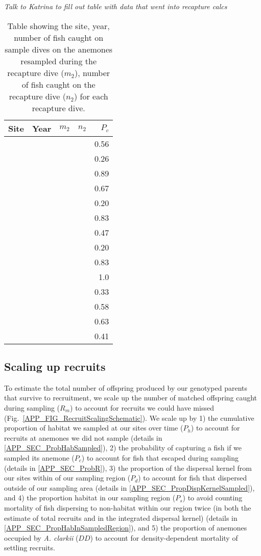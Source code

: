 \documentclass[12pt, oneside]{article}   	%
\begin{document}
\textit{Talk to Katrina to fill out table with data that went into recapture calcs}

\begin{table}[!htbp]
\caption{Table showing the site, year, number of fish caught on sample dives on the anemones resampled during the recapture dive ($m_2$), number of fish caught on the recapture dive ($n_2$) for each recapture dive.} \label{APP_TAB_RecapDives}
\begin{centering}
\begin{tabular}{|l|r|r|r|r|}
\hline
Site & Year & $m_2$ & $n_2$ & $P_c$ \\ \hline
& & & & 0.56 \\ \hline
& & & & 0.26 \\ \hline
& & & & 0.89 \\ \hline
& & & & 0.67 \\ \hline
& & & & 0.20 \\ \hline
& & & & 0.83 \\ \hline
& & & & 0.47 \\ \hline
& & & & 0.20 \\ \hline
& & & & 0.83 \\ \hline
& & & & 1.0 \\ \hline
& & & & 0.33 \\ \hline
& & & & 0.58 \\ \hline
& & & & 0.63 \\ \hline
& & & & 0.41 \\ \hline
\end{tabular}
\end{centering}
\end{table}

\newpage{}

\subsection{Scaling up recruits}

To estimate the total number of offspring produced by our genotyped parents that survive to recruitment, we scale up the number of matched offspring caught during sampling ($R_m$) to account for recruits we could have missed (Fig.\ \ref{APP_FIG_RecruitScalingSchematic}). We scale up by 1) the cumulative proportion of habitat we sampled at our sites over time ($P_h$) to account for recruits at anemones we did not sample (details in \ref{APP_SEC_ProbHabSampled}), 2) the probability of capturing a fish if we sampled its anemone ($P_c$) to account for fish that escaped during sampling (details in \ref{APP_SEC_ProbR}), 3) the proportion of the dispersal kernel from our sites within of our sampling region ($P_d$) to account for fish that dispersed outside of our sampling area (details in \ref{APP_SEC_PropDispKernelSampled}), and 4) the proportion habitat in our sampling region ($P_s$) to avoid counting mortality of fish dispersing to non-habitat within our region twice (in both the estimate of total recruits and in the integrated dispersal kernel) (details in \ref{APP_SEC_PropHabInSampledRegion}), and 5) the proportion of anemones occupied by \textit{A. clarkii} ($DD$) to account for density-dependent mortality of settling recruits.
\end{document}
